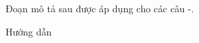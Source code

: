\documentclass[11pt]{./internal/module/latex_compiler/latex_source/question/examdesign}
\begin{document}
\normalsize
\setlength{\beforesectsep}{10pt}
\begin{vnmultiplechoice}

\begin{block}[questions=0]
Đoạn mô tả sau được áp dụng cho các câu \thefirst-\thelast.

Hướng dẫn
\end{block}

\end{vnmultiplechoice}
\end{document}
